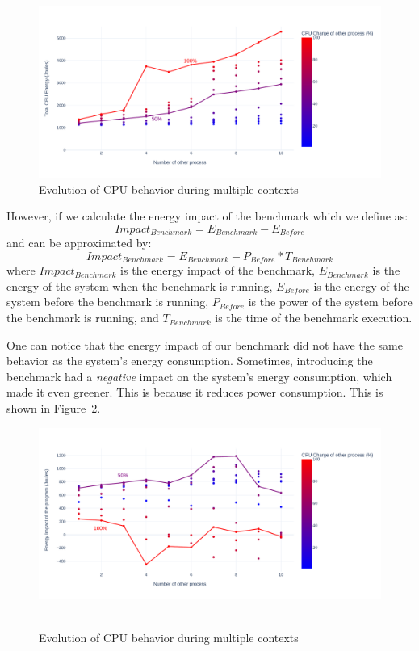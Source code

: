 \begin{figure}[!h]
      \centering
      \caption{Evolution of CPU behavior during multiple contexts }
      \label{fig:green_faas_energy}
      \includegraphics[width=\linewidth]{chapters/green_faas_energy}
\end{figure}

However, if we calculate the energy impact of the benchmark which we define as: 
\begin{equation}
      Impact_{Benchmark} =E_{Benchmark} - E_{Before}
\end{equation}
and can be approximated by:
\begin{equation}
      Impact_{Benchmark} =E_{Benchmark} - P_{Before} * T_{Benchmark}
\end{equation}
where $Impact_{Benchmark}$ is the energy impact of the benchmark, $E_{Benchmark}$ is the energy of the system when the benchmark is running, $E_{Before}$ is the energy of the system before the benchmark is running, $P_{Before}$ is the power of the system before the benchmark is running, and $T_{Benchmark}$ is the time of the benchmark execution.

One can notice that the energy impact of our benchmark did not have the same behavior as the system's energy consumption.
Sometimes, introducing the benchmark had a \emph{negative} impact on the system's energy consumption, which made it even greener.
This is because it reduces power consumption.
This is shown in Figure~\ref{fig:green_faas_impact}.

\begin{figure}[!t]
      \centering
      \caption{Evolution of CPU behavior during multiple contexts }
      \includegraphics[width=\linewidth]{chapters/green_faas_impact}\
      \label{fig:green_faas_impact}
\end{figure}

